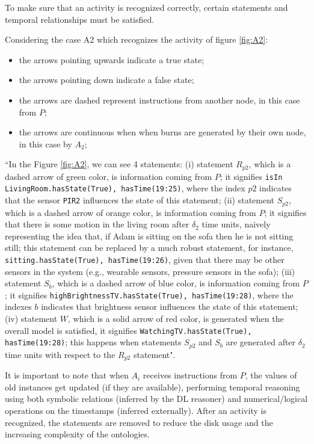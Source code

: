 \documentclass{thesisreport}
\begin{document}
 To make sure that an activity is recognized correctly, certain statements and temporal relationships must be satisfied.
 
 Considering the case A2 which recognizes the activity of figure \ref{fig:A2}:
 \begin{itemize}
     \item the arrows pointing upwards indicate a true state;
     \item the arrows pointing down indicate a false state;
     \item the arrows are dashed represent instructions from another node, in this case from $P$;
     \item the arrows are continuous when when burns are generated by their own node, in this case by $A_2$;
 \end{itemize}
 
 ``In the Figure \ref{fig:A2}, we can see 4 statements: (i) statement $R_{p2}$, which is a dashed arrow of green color, is information coming from $P$; it signifies \texttt{isIn LivingRoom.{hasState(True), hasTime(19:25)}}, where the index $p2$ indicates that the sensor \texttt{PIR2} influences the state of this statement; (ii) statement $S_{p2}$, which is a dashed arrow of orange color, is information coming from $P$; it signifies that there is some motion in the living room after $\delta_2$ time units, naively representing the idea that, if Adam is sitting on the sofa then he is not sitting still; this statement can be replaced by a much robust statement, for instance, \texttt{sitting.{hasState(True), hasTime(19:26)}}, given that there may be other sensors in the system (e.g., wearable sensors, pressure sensors in the sofa); (iii) statement $S_b$, which is a dashed arrow of blue color, is information coming from $P$; it signifies \texttt{highBrightnessTV.{hasState(True), hasTime(19:28)}}, where the indexes $b$ indicates that brightness sensor influences the state of this statement; (iv) statement $W$, which is a solid arrow of red color, is generated when the overall model is satisfied, it signifies \texttt{WatchingTV.{hasState(True), hasTime(19:28)}}; this happens when statements $S_{p2}$ and $S_b$ are generated after $\delta_2$ time units with respect to the $R_{p2}$ statement".
 

 It is important to note that when $A_i$ receives instructions from $P$, the values of old instances get updated (if they are available), performing temporal reasoning using both symbolic relations (inferred by the DL reasoner) and numerical/logical operations on the timestamps (inferred externally). 
 After an activity is recognized, the statements are removed to reduce the disk usage and the increasing complexity of the ontologies. 
 
\end{document}
